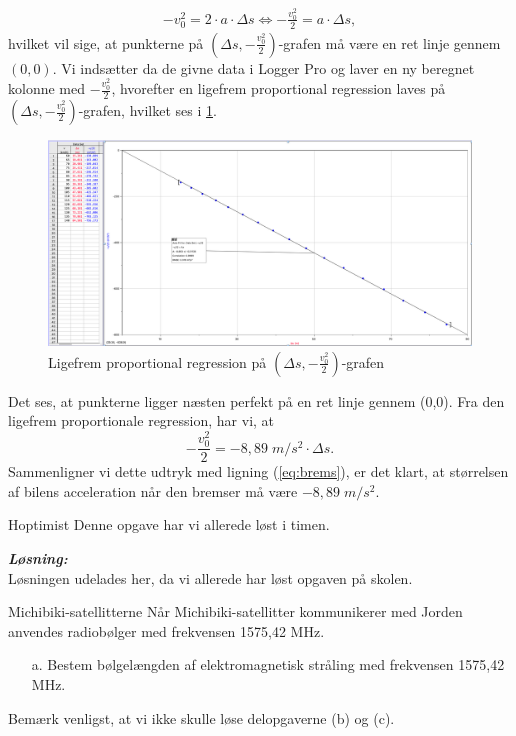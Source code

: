 \documentclass{report}
\newcommand{\sol}{\setlength{\parindent}{0cm}\textbf{\textit{Løsning:}}\setlength{\parindent}{1cm}}
\begin{document}
\begin{equation}
  \label{eq:brems}
\begin{split}
  -v_0^2=2 \cdot a \cdot \Delta s \iff -\frac{v_0^2}{2}=a \cdot \Delta s,
\end{split}
\end{equation}
hvilket vil sige, at punkterne på $\left(\Delta s, -\frac{v_0^2}{2}\right) $-grafen må være en ret linje gennem $(0,0)$.
Vi indsætter da de givne data i Logger Pro og laver en ny beregnet kolonne med $-\frac{v_0^2}{2}$, hvorefter en ligefrem proportional regression laves på $\left(\Delta s, -\frac{v_0^2}{2}\right) $-grafen, hvilket ses i \cref{fig:bremse}. 
\begin{figure}[H]
\begin{center}
  \includegraphics[width=\textwidth]{bremse.png}
\end{center}
\caption{Ligefrem proportional regression på $\left(\Delta s, -\frac{v_0^2}{2}\right) $-grafen}
\label{fig:bremse}
\end{figure}
Det ses, at punkterne ligger næsten perfekt på en ret linje gennem (0,0).
Fra den ligefrem proportionale regression, har vi, at
\[
-\frac{v_0^2}{2}=-8,89 \;\unit{m/s^2} \cdot \Delta s.
\] 
Sammenligner vi dette udtryk med ligning (\ref{eq:brems}), er det klart, at størrelsen af bilens acceleration når den bremser må være $-8,89 \;\unit{m/s^2}$.
\begin{question}{Hoptimist}{}
  Denne opgave har vi allerede løst i timen.
\end{question}
\sol \\
Løsningen udelades her, da vi allerede har løst opgaven på skolen.
\begin{question}{Michibiki-satellitterne}{}
  Når Michibiki-satellitter kommunikerer med Jorden anvendes radiobølger med frekvensen 1575,42 MHz.
\begin{itemize}
  \item[a.] Bestem bølgelængden af elektromagnetisk stråling med frekvensen 1575,42 MHz.
\end{itemize}
\begin{note}
  Bemærk venligst, at vi ikke skulle løse delopgaverne (b) og (c).
\end{note}
\end{question}
\end{document}
